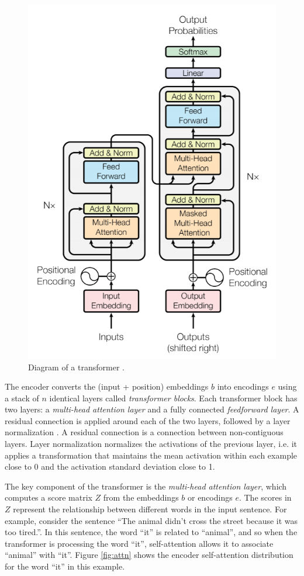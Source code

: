 
\begin{figure}[!h]
 \centering
 \includegraphics[width=0.55\columnwidth]{imgs/background/transformer.png}
 \caption{Diagram of a transformer \cite{vaswani2017attention}.}
 \label{fig:transformer}
\end{figure}

The encoder converts the (input + position) embeddings $b$ into encodings $e$ using a stack of $n$ identical layers called \textit{transformer blocks}. Each transformer block has two layers: a \textit{multi-head attention layer} and a fully connected \textit{feedforward layer}. A residual connection \cite{he2016deep} is applied around each of the two layers, followed by a layer normalization \cite{ba2016layer}. A residual connection is a connection between non-contiguous layers. Layer normalization normalizes the activations of the previous layer, i.e. it applies a transformation that maintains the mean activation within each example close to 0 and the activation standard deviation close to 1.

The key component of the transformer is the \textit{multi-head attention layer}, which computes a score matrix $Z$ from the embeddings $b$ or encodings $e$. The scores in $Z$ represent the relationship between different words in the input sentence. For example, consider the sentence ``The animal didn't cross the street because it was too tired.''. In this sentence, the word ``it'' is related to ``animal'', and so when the transformer is processing the word ``it'', self-attention allows it to associate ``animal'' with ``it''. Figure \ref{fig:attn} shows the encoder self-attention distribution for the word ``it'' in this example.

